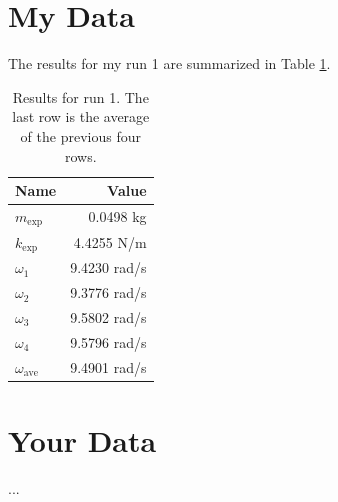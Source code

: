 \section{My Data}
The results for my run 1 are summarized in Table \ref{table.11.results}.
\begin{table} \label{table.11.results}
    \centering
    \begin{tabular}{|l|r|}
        \hline
        Name & Value \\
        \hline
        $m_{\text{exp}}$ & 0.0498 kg \\
        $k_{\text{exp}}$ & 4.4255 N/m \\
        $\omega_{1}$ & 9.4230 rad/s \\
        $\omega_{2}$ & 9.3776 rad/s \\
        $\omega_{3}$ & 9.5802 rad/s \\
        $\omega_{4}$ & 9.5796 rad/s \\
        \hline
        $\omega_{\text{ave}}$ & 9.4901 rad/s \\
        \hline
    \end{tabular}
    \caption{Results for run 1. The last row is the average of the previous four rows.}
\end{table}
\section{Your Data}
...
